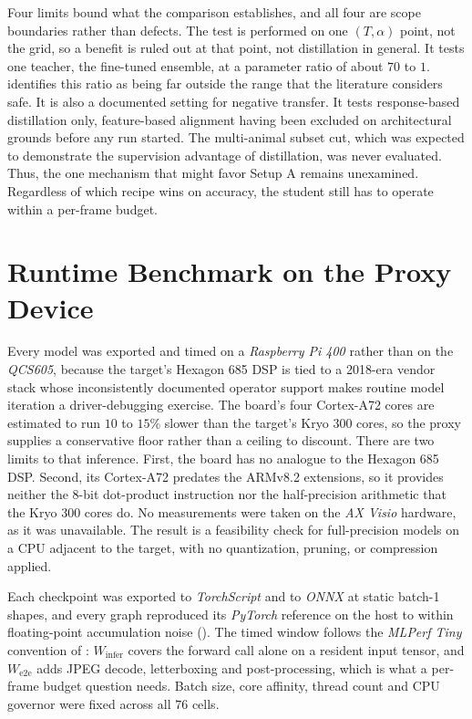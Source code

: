 Four limits bound what the comparison establishes, and all four are scope boundaries rather than defects. The test is performed on one $(T, \alpha)$ point, not the  grid, so a benefit is ruled out at that point, not distillation in general. It tests one teacher, the fine-tuned ensemble, at a parameter ratio of about $70$ to $1$.  identifies this ratio as being far outside the range that the literature considers safe. It is also a documented setting for negative transfer. It tests response-based distillation only, feature-based alignment having been excluded on architectural grounds before any run started. The multi-animal subset cut, which was expected to demonstrate the supervision advantage of distillation, was never evaluated. Thus, the one mechanism that might favor Setup A remains unexamined. Regardless of which recipe wins on accuracy, the student still has to operate within a per-frame budget.

\section{Runtime Benchmark on the Proxy Device}\label{sec:results_embedded_benchmark}

Every model was exported and timed on a \textit{Raspberry Pi 400} rather than on the \textit{QCS605}, because the target's Hexagon 685 DSP is tied to a 2018-era vendor stack whose inconsistently documented operator support makes routine model iteration a driver-debugging exercise. The board's four Cortex-A72 cores are estimated to run $10$ to $15\%$ slower than the target's Kryo 300 cores, so the proxy supplies a conservative floor rather than a ceiling to discount.  %
There are two limits to that inference. First, the board has no analogue to the Hexagon 685 DSP. Second, its Cortex-A72 predates the ARMv8.2 extensions, so it provides neither the $8$-bit dot-product instruction nor the half-precision arithmetic that the Kryo 300 cores do.  %
No measurements were taken on the \textit{AX Visio} hardware, as it was unavailable. The result is a feasibility check for full-precision models on a CPU adjacent to the target, with no quantization, pruning, or compression applied.

Each checkpoint was exported to \textit{TorchScript} and to \textit{ONNX} at static batch-1 shapes, and every graph reproduced its \textit{PyTorch} reference on the host to within floating-point accumulation noise (). The timed window follows the \textit{MLPerf Tiny} convention of : $W_{\mathrm{infer}}$ covers the forward call alone on a resident input tensor, and $W_{\mathrm{e2e}}$ adds JPEG decode, letterboxing and post-processing, which is what a per-frame budget question needs. Batch size, core affinity, thread count and CPU governor were fixed across all $76$ cells.


